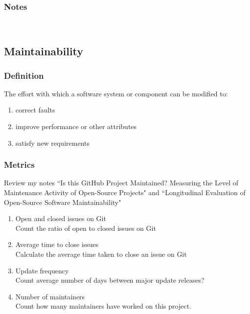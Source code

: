 \documentclass{article}
\begin{document}
\subsubsection{Notes}

~\newpage

\subsection{Maintainability}
\subsubsection{Definition}
The effort with which a software system or component can be modified to:

\begin{enumerate}
	\item correct faults
	\item improve performance or other
	attributes
	\item satisfy new requirements
\end{enumerate}

\subsubsection{Metrics}
Review my notes ``Is this GitHub Project Maintained? Measuring the Level of Maintenance Activity of Open-Source Projects" and ``Longitudinal Evaluation of Open-Source Software Maintainability"

\begin{enumerate}
	\item Open and closed issues on Git\\
	
	Count the ratio of open to closed issues on Git
	\item Average time to close issues\\
	
	Calculate the average time taken to close an issue on Git
	\item Update frequency\\
	
	Count average number of days between major update releases?
	\item Number of maintainers
\\
	
	Count how many maintainers have worked on this project.\\
\end{enumerate}
\end{document}
